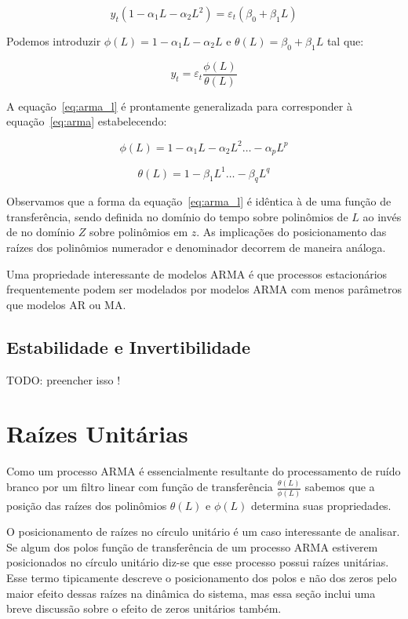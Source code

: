$$ y_t (1 - \alpha_1 L - \alpha_2 L^2) = \varepsilon_{t} (\beta_0 + \beta_1 L) $$

Podemos introduzir $\phi(L) = 1 - \alpha_1 L - \alpha_2 L$ e $\theta(L) =
\beta_0 + \beta_1 L$ tal que:

\begin{equation}\label{eq:arma_l}
    y_t = \varepsilon_t \frac{\phi(L)}{\theta(L)}
\end{equation}

A equação~\ref{eq:arma_l} é prontamente generalizada para corresponder à
equação~\ref{eq:arma} estabelecendo:

$$\phi(L) = 1 - \alpha_1 L - \alpha_2 L^2 \hdots - \alpha_p L^p$$

$$\theta(L) = 1 - \beta_1 L^1 \hdots - \beta_q L^q$$


Observamos que a forma da equação~\ref{eq:arma_l} é idêntica à de uma função de
transferência, sendo definida no domínio do tempo sobre polinômios de $L$ ao
invés de no domínio $Z$ sobre polinômios em $z$. As implicações do
posicionamento das raízes dos polinômios numerador e denominador decorrem de
maneira análoga.

Uma propriedade interessante de modelos ARMA é que processos estacionários
frequentemente podem ser modelados por modelos ARMA com menos parâmetros que
modelos AR ou MA.

\subsection{Estabilidade e Invertibilidade}
\label{ssec:stability_invertibility}
TODO: preencher isso !

\section{Raízes Unitárias}
\label{sec:unit_roots}

Como um processo ARMA é essencialmente resultante do processamento de ruído
branco por um filtro linear com função de transferência
$\frac{\theta(L)}{\phi(L)}$ sabemos que a posição das raízes dos polinômios
$\theta(L)$ e $\phi(L)$ determina suas propriedades.

O posicionamento de raízes no círculo unitário é um caso interessante de
analisar. Se algum dos polos função de transferência de um processo ARMA
estiverem posicionados no círculo unitário diz-se que esse processo possui
raízes unitárias. Esse termo tipicamente descreve o posicionamento dos polos e
não dos zeros pelo maior efeito dessas raízes na dinâmica do sistema, mas essa
seção inclui uma breve discussão sobre o efeito de zeros unitários também.


